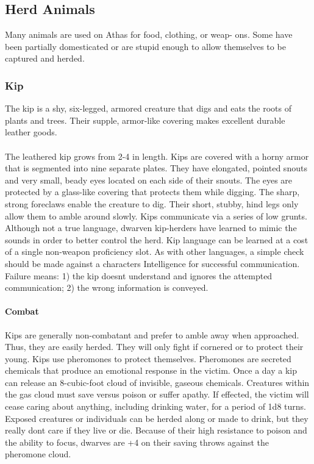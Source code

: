 \subsection{Herd Animals}
Many animals are used on Athas for food, clothing, or weap-
ons. Some have been partially domesticated or are stupid
enough to allow themselves to be captured and herded.

\subsubsection{Kip}

The kip is a shy, six-legged, armored creature that digs and eats
the roots of plants and trees. Their supple, armor-like covering
makes excellent durable leather goods.\\
\\
The leathered kip grows from 2-4 in length. Kips are covered
with a horny armor that is segmented into nine separate plates.
They have elongated, pointed snouts and very small, beady
eyes located on each side of their snouts. The eyes are protected
by a glass-like covering that protects them while digging. The
sharp, strong foreclaws enable the creature to dig. Their short,
stubby, hind legs only allow them to amble around slowly.
Kips communicate via a series of low grunts. Although not a
true language, dwarven kip-herders have learned to mimic the
sounds in order to better control the herd. Kip language can be
learned at a cost of a single non-weapon proficiency slot. As
with other languages, a simple check should be made against a
characters Intelligence for successful communication. Failure
means: 1) the kip doesnt understand and ignores the attempted
communication; 2) the wrong information is conveyed.

\paragraph{Combat}
Kips are generally non-combatant and prefer to amble
away when approached. Thus, they are easily herded. They will
only fight if cornered or to protect their young. Kips use pheromones
to protect themselves. Pheromones are secreted chemicals that
produce an emotional response in the victim. Once a
day a kip can release an 8-cubic-foot cloud of invisible, gaseous
chemicals. Creatures within the gas cloud must save versus poison
or suffer apathy. If effected, the victim will cease caring
about anything, including drinking water, for a period of 1d8
turns. Exposed creatures or individuals can be herded along or
made to drink, but they really dont care if they live or die.
Because of their high resistance to poison and the ability to focus,
dwarves are +4 on their saving throws against the pheromone
cloud.

